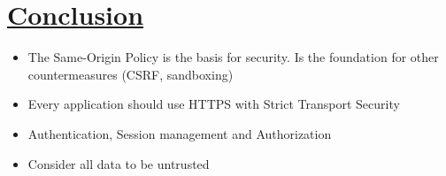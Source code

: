 \documentclass[titlepage]{article}
\begin{document}
    \section{\href{https://youtu.be/g9Te4Jy9nBc}{Conclusion}}
    \begin{itemize}
        \item The Same-Origin Policy is the basis for security. Is the foundation for other countermeasures (CSRF, sandboxing)
        \item Every application should use HTTPS with Strict Transport Security
        \item Authentication, Session management and Authorization
        \item Consider all data to be untrusted
    \end{itemize}
    
\end{document}
